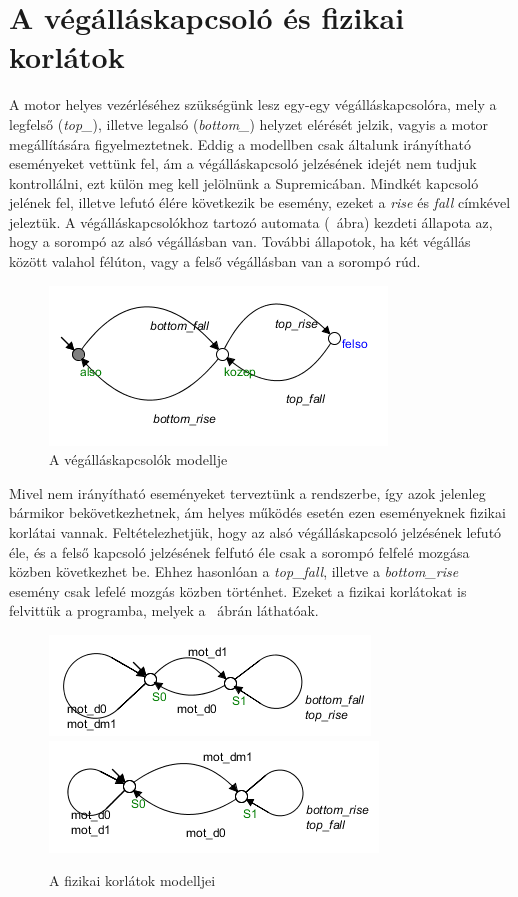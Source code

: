 \section{A végálláskapcsoló és fizikai korlátok}
A motor helyes vezérléséhez szükségünk lesz egy-egy végálláskapcsolóra, mely a legfelső (\textit{top\_}), illetve legalsó (\textit{bottom\_}) helyzet elérését jelzik, vagyis a motor megállítására figyelmeztetnek. Eddig a modellben csak általunk irányítható eseményeket vettünk fel, ám a végálláskapcsoló jelzésének idejét nem tudjuk kontrollálni, ezt külön meg kell jelölnünk a Supremicában. Mindkét kapcsoló jelének fel, illetve lefutó élére következik be esemény, ezeket a \textit{rise} és \textit{fall} címkével jeleztük. A végálláskapcsolókhoz tartozó automata (~ábra) kezdeti állapota az, hogy a sorompó az alsó végállásban van. További állapotok, ha két végállás között valahol félúton, vagy a felső végállásban van a sorompó rúd.
\begin{figure}
	\centering
	\includegraphics[keepaspectratio]{figures/2m03/b2_limit.png}
	\caption{A végálláskapcsolók modellje}
	\label{fig:Limit}
\end{figure}
Mivel nem irányítható eseményeket terveztünk a rendszerbe, így azok jelenleg bármikor bekövetkezhetnek, ám helyes működés esetén ezen eseményeknek fizikai korlátai vannak. Feltételezhetjük, hogy az alsó végálláskapcsoló jelzésének lefutó éle, és a felső kapcsoló jelzésének felfutó éle csak a sorompó felfelé mozgása közben következhet be. Ehhez hasonlóan a \textit{top\_fall}, illetve a \textit{bottom\_rise} esemény csak lefelé mozgás közben történhet. Ezeket a fizikai korlátokat is felvittük a programba, melyek a ~ábrán láthatóak.

\begin{figure}
	\centering
	\includegraphics[keepaspectratio]{figures/2m03/b2_constr1.png}	
	\includegraphics[keepaspectratio]{figures/2m03/b2_constr2.png}
	\caption{A fizikai korlátok modelljei}
	\label{fig:Constraints}
\end{figure}

